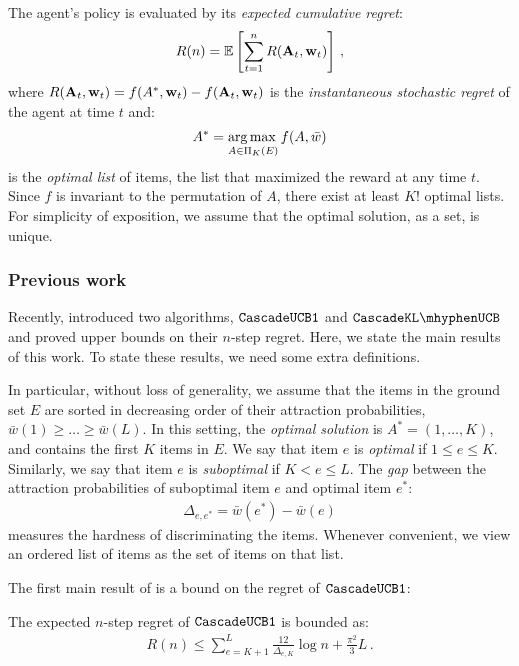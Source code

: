 The agent's policy is evaluated by its \emph{expected cumulative regret}:
\begin{align*}
  R(n) = \mathbb{E} \left[\sum_{t = 1}^n R(\mathbf{A}_t, \mathbf{w}_t)\right]\,,
\end{align*}
where $R(\mathbf{A}_t, \mathbf{w}_t) = f(A^\ast, \mathbf{w}_t) - f(\mathbf{A}_t, \mathbf{w}_t)$ is the \emph{instantaneous stochastic regret} of the agent at time $t$ and:
\begin{align*}
  A^\ast = \operatorname*{arg\,max\,}_{A \in \Pi_K(E)} f(A, \bar{w})
\end{align*}
is the \emph{optimal list} of items, the list that maximized the reward at any time $t$. Since $f$ is invariant to the permutation of $A$, there exist at least $K!$ optimal lists. For simplicity of exposition, we assume that the optimal solution, as a set, is unique.


\subsubsection{Previous work}

Recently, \citet{kveton15cascade} introduced two algorithms,  ${\tt CascadeUCB1}$ and $\cascadeklucb$
and proved upper bounds on their $n$-step regret.
Here, we state the main results of this work.
To state these results, we need some extra definitions.

In particular, without loss of generality, we assume that the items in the ground set $E$
 are sorted in decreasing order of their attraction probabilities, $\bar{w}(1) \geq \ldots \geq \bar{w}(L)$. In this setting, the \emph{optimal solution} is $A^\ast = (1, \dots, K)$, and contains the first $K$ items in $E$. We say that item $e$ is \emph{optimal} if $1 \leq e \leq K$. Similarly, we say that item $e$ is \emph{suboptimal} if $K < e \leq L$. The \emph{gap} between the attraction probabilities of suboptimal item $e$ and optimal item $e^\ast$:
\begin{align}
  \Delta_{e, e^\ast} = \bar{w}(e^\ast) - \bar{w}(e)
  \label{eq:gap}
\end{align}
measures the hardness of discriminating the items. Whenever convenient, we view an ordered list of items as the set of items on that list.

The first main result of  \citet{kveton15cascade} is a bound on the regret of ${\tt CascadeUCB1}$:
\begin{theorem}
\label{thm:ucb1} The expected $n$-step regret of ${\tt CascadeUCB1}$ is bounded as:
\begin{align*}
  R(n) \leq
  \sum_{e = K + 1}^L \frac{12}{\Delta_{e, K}} \log n + \frac{\pi^2}{3} L\,.
\end{align*}
\end{theorem}

